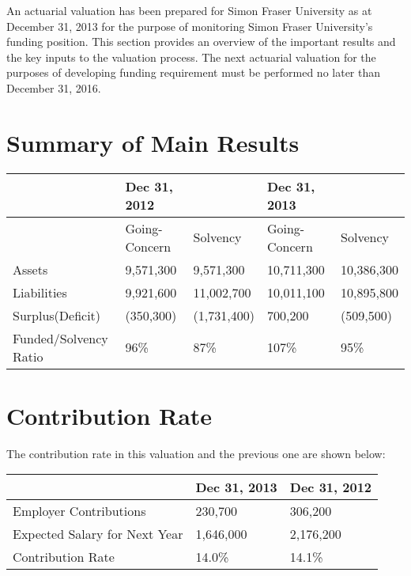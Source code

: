\documentclass{report}
\begin{document}
\tableofcontents
\large

\pagebreak
{}
An actuarial valuation has been prepared for Simon Fraser University as at December 31, 2013 for the purpose of monitoring Simon Fraser University's funding position. This section provides an overview of the important results and the key inputs to the valuation process. The next actuarial valuation for the purposes of developing funding requirement must be performed no later than December 31, 2016.

\section{Summary of Main Results}
\begin{table}[ht]
\bgroup
\def\arraystretch{1.5}
\begin{tabular}{l  l  l  l  l}
\hline
& \textbf{Dec 31, 2012} &  & \textbf{Dec 31, 2013} & \\ \hline
& Going-Concern & Solvency & Going-Concern & Solvency \\ \hline
Assets & 9,571,300 & 9,571,300  & 10,711,300 & 10,386,300 \\ \hline
Liabilities & 9,921,600 & 11,002,700 & 10,011,100 & 10,895,800 \\ \hline
Surplus(Deficit) & (350,300) & (1,731,400) & 700,200 & (509,500) \\ \hline
Funded/Solvency Ratio & 96\% & 87\% & 107\% & 95\% \\ \hline
\end{tabular}
\egroup
\end{table}

\section{Contribution Rate}

The contribution rate in this valuation and the previous one are shown below:

\begin{table}[ht]
\bgroup
\def\arraystretch{1.5}
\begin{tabular}{p{6cm} p{3cm} p{3cm}}
\hline
 & \textbf{Dec 31, 2013} &  \textbf{Dec 31, 2012} \\ \hline
Employer Contributions & 230,700 & 306,200 \\ \hline
Expected Salary for Next Year & 1,646,000 & 2,176,200 \\ \hline
Contribution Rate & 14.0\% & 14.1\% \\ \hline
\end{tabular}
\egroup
\end{table}
\end{document}

